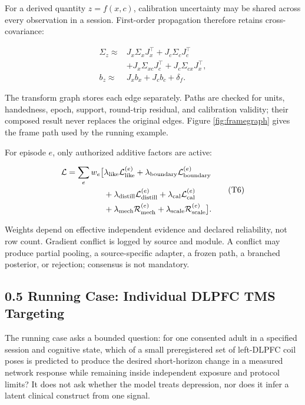 For a derived quantity \(z=f(x,c)\), calibration uncertainty may be shared
across every observation in a session. First-order propagation therefore
retains cross-covariance:

\[
\begin{aligned}
\Sigma_z\approx{}&J_x\Sigma_xJ_x^\top+J_c\Sigma_cJ_c^\top\\
&+J_x\Sigma_{xc}J_c^\top+J_c\Sigma_{cx}J_x^\top,\\
b_z\approx{}&J_xb_x+J_cb_c+\delta_f .
\end{aligned}
\tag{T5}
\]

The transform graph stores each edge separately. Paths are checked for units,
handedness, epoch, support, round-trip residual, and calibration validity;
their composed result never replaces the original edges. Figure
\ref{fig:framegraph} gives the frame path used by the running example.

\FrameGraphFigure

For episode \(e\), only authorized additive factors are active:

\[
\begin{aligned}
\mathcal L=\sum_e w_e\bigl[&
\lambda_{\rm like}\mathcal L_{\rm like}^{(e)}
+\lambda_{\rm boundary}\mathcal L_{\rm boundary}^{(e)}\\
&+\lambda_{\rm distill}\mathcal L_{\rm distill}^{(e)}
+\lambda_{\rm cal}\mathcal L_{\rm cal}^{(e)}\\
&+\lambda_{\rm mech}\mathcal R_{\rm mech}^{(e)}
+\lambda_{\rm scale}\mathcal R_{\rm scale}^{(e)}\bigr].
\end{aligned}
\tag{T6}
\]

Weights depend on effective independent evidence and declared reliability, not
row count. Gradient conflict is logged by source and module. A conflict may
produce partial pooling, a source-specific adapter, a frozen path, a branched
posterior, or rejection; consensus is not mandatory.

\subsection{0.5 Running Case: Individual DLPFC TMS Targeting}

The running case asks a bounded question: for one consented adult in a
specified session and cognitive state, which of a small preregistered set of
left-DLPFC coil poses is predicted to produce the desired short-horizon change
in a measured network response while remaining inside independent exposure
and protocol limits? It does not ask whether the model treats depression, nor
does it infer a latent clinical construct from one signal.

